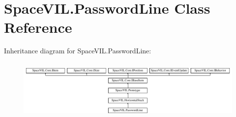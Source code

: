 \hypertarget{class_space_v_i_l_1_1_password_line}{}\section{Space\+V\+I\+L.\+Password\+Line Class Reference}
\label{class_space_v_i_l_1_1_password_line}
Inheritance diagram for Space\+V\+I\+L.\+Password\+Line\+:\begin{figure}[H]
\begin{center}
\leavevmode
\includegraphics[height=3.027027cm]{class_space_v_i_l_1_1_password_line}
\end{center}
\end{figure}
